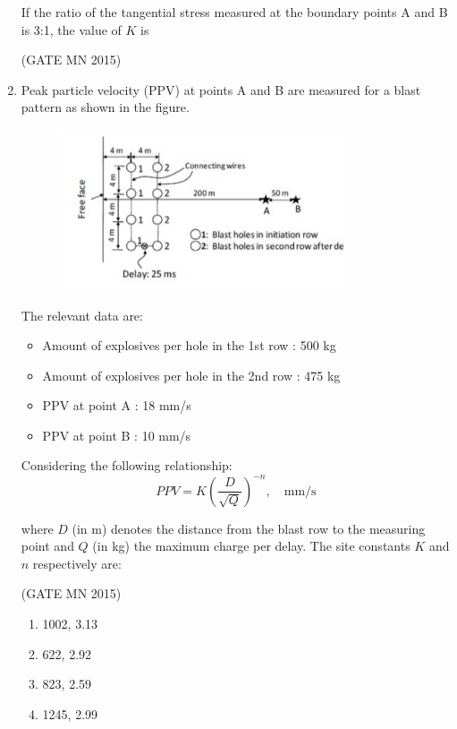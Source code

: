 \documentclass[journal]{IEEEtran}
\begin{document}
\begin{enumerate}
If the ratio of the tangential stress measured at the boundary points A and B is 3:1, the value of $K$ is \underline{\hspace{2cm}}  

\hfill(GATE MN 2015)



\item Peak particle velocity (PPV) at points A and B are measured for a blast pattern as shown in the figure. \\

\begin{figure}[H]                                
\centering
	\includegraphics[width=0.8\textwidth]{Screenshot_2025_0818_085913.png}
\caption{}                                   
\label{fig:Q61}                          
\end{figure}

The relevant data are:
\begin{itemize}
\item Amount of explosives per hole in the 1st row : 500 kg
\item Amount of explosives per hole in the 2nd row : 475 kg
\item PPV at point A : 18 mm/s
\item PPV at point B : 10 mm/s
\end{itemize}

Considering the following relationship:
\[
PPV = K \left( \frac{D}{\sqrt{Q}} \right)^{-n}, \quad \text{mm/s}
\]

where \(D\) (in m) denotes the distance from the blast row to the measuring point and \(Q\) (in kg) the maximum charge per delay. The site constants \(K\) and \(n\) respectively are:

\hfill(GATE MN 2015)
\begin{multicols}{2}
\begin{enumerate}
\item 1002, 3.13
\item 622, 2.92
\item 823, 2.59
\item 1245, 2.99
\end{enumerate}
\end{multicols}



\end{enumerate}
\end{document}
